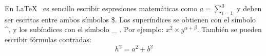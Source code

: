 En \LaTeX{}~\cite{Lamport:LDP94} es sencillo escribir espresiones
matemáticas como $a=\sum_{i=1}^{3}$
y deben ser escritas entre ambos símbolos \$.
Los superíndices se obtienen con el símbolo \^{}, y
los subíndices con el símbolo \_ .
Por ejemplo: $x^2 \times y^{\alpha + \beta}$.
También se pueden escribir fórmulas contradas:
\[h^2=a^2 + b^2 \]